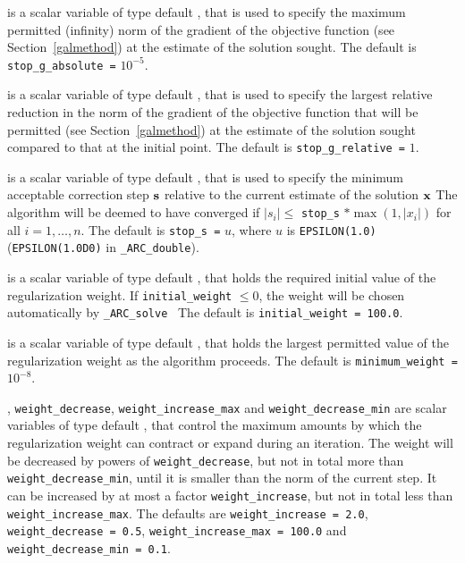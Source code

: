 \documentclass{galahad}
\newcommand{\packagename}{ARC}
\newcommand{\fullpackagename}{\libraryname\_\packagename}
\newcommand{\solver}{{\tt \fullpackagename\_solve}}
\begin{document}
\begin{description}
 is a scalar variable of type default \realdp,
that is used to specify the maximum permitted (infinity)
norm of the gradient of the objective function
(see Section~\ref{galmethod}) at the estimate of the solution sought.
The default is {\tt stop\_g\_absolute =} $10^{-5}$.

 is a scalar variable of type default \realdp,
that is used to specify the largest relative reduction in the norm of the
gradient of the objective function that will be permitted
(see Section~\ref{galmethod}) at the estimate of the solution sought
compared to that at the initial point.
The default is {\tt stop\_g\_relative =} $1$.

 is a scalar variable of type default \realdp,
that is used to specify the minimum acceptable correction step ${\mathbf{s}}$
relative to the current estimate of the solution ${\mathbf{x}}$
The algorithm will be deemed to have converged if $|s_i| \leq$
{\tt stop\_s} $\ast \max( 1, |x_i|)$ for all $i = 1, \ldots, n$.
The default is {\tt stop\_s =} $u$,
where $u$ is {\tt EPSILON(1.0)} ({\tt EPSILON(1.0D0)} in
{\tt \fullpackagename\_double}).

 is a scalar variable of type default \realdp, that holds
the required initial value of the regularization weight. If
{\tt initial\_weight} $\leq 0$, the weight will be chosen automatically
by \solver\
The default is {\tt initial\_weight = 100.0}.

 is a scalar variable of type default \realdp, that holds
the largest permitted value of the regularization weight as the algorithm
proceeds.
The default is {\tt minimum\_weight =} $10^{-8}$.

,
{\tt weight\_decrease},
{\tt weight\_increase\_max}
and
{\tt weight\_decrease\_min}
are scalar variables of type default \realdp, that
control the maximum amounts by which the regularization weight can
contract or expand during an iteration. The weight will be decreased by
powers of {\tt weight\_decrease}, but not in total
more than  {\tt weight\_decrease\_min}, until it is smaller than the norm of
the current step.
It can be increased by at most a factor {\tt weight\_increase}, but not
in total less than {\tt weight\_increase\_max}.
The defaults are
{\tt weight\_increase = 2.0},
{\tt weight\_decrease = 0.5},
{\tt weight\_incr\-ease\_max = 100.0} and
{\tt weight\_decrease\_min = 0.1}.


\end{description}
\end{document}
